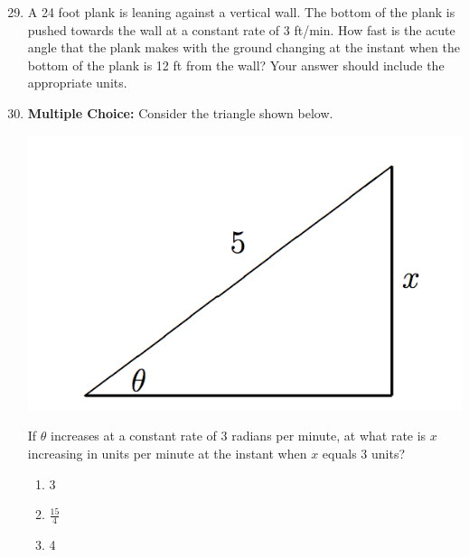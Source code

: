 \documentclass[12pt]{article}
\newif\ifans
\begin{document}
\begin{enumerate}
\setcounter{enumi}{28}

\item A 24 foot plank is leaning against a vertical wall.  The bottom of the plank is pushed towards the wall at a constant rate of 3 ft/min.  How fast is the acute angle that the plank makes with the ground changing at the instant when the bottom of the plank is 12 ft from the wall?  Your answer should include the appropriate units.

\ifans{\fbox{$\frac{1}{4\sqrt{3}}$ radians per minute}} \fi

\item {\bf Multiple Choice:} Consider the triangle shown below.
\begin{center}
\includegraphics[scale=0.5]{triangle.png}
\end{center}
If $\theta$ increases at a constant rate of 3 radians per minute, at what rate is $x$ increasing in units per minute at the instant when $x$ equals 3 units?

\begin{enumerate}

\item 3

\item $\frac{15}{4}$

\item 4


\end{enumerate}
\end{enumerate}
\end{document}
